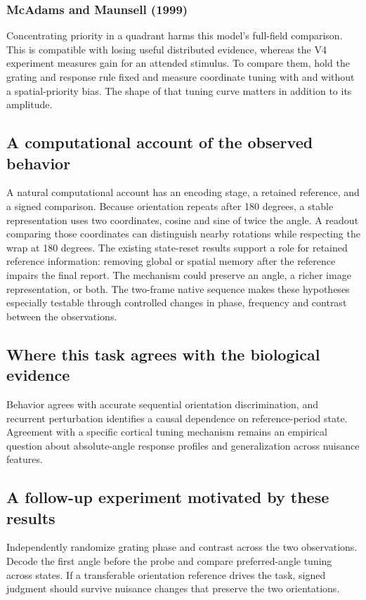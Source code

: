 \documentclass[11pt]{article}
\begin{document}
\subsubsection{McAdams and Maunsell (1999)}
Concentrating priority in a quadrant harms this model’s full-field comparison. This is compatible with losing useful distributed evidence, whereas the V4 experiment measures gain for an attended stimulus. To compare them, hold the grating and response rule fixed and measure coordinate tuning with and without a spatial-priority bias. The shape of that tuning curve matters in addition to its amplitude. \cite{bio_mcadams}

\subsection{A computational account of the observed behavior}
A natural computational account has an encoding stage, a retained reference, and a signed comparison. Because orientation repeats after 180 degrees, a stable representation uses two coordinates, cosine and sine of twice the angle. A readout comparing those coordinates can distinguish nearby rotations while respecting the wrap at 180 degrees. The existing state-reset results support a role for retained reference information: removing global or spatial memory after the reference impairs the final report. The mechanism could preserve an angle, a richer image representation, or both. The two-frame native sequence makes these hypotheses especially testable through controlled changes in phase, frequency and contrast between the observations.

\subsection{Where this task agrees with the biological evidence}
Behavior agrees with accurate sequential orientation discrimination, and recurrent perturbation identifies a causal dependence on reference-period state. Agreement with a specific cortical tuning mechanism remains an empirical question about absolute-angle response profiles and generalization across nuisance features.

\subsection{A follow-up experiment motivated by these results}
Independently randomize grating phase and contrast across the two observations. Decode the first angle before the probe and compare preferred-angle tuning across states. If a transferable orientation reference drives the task, signed judgment should survive nuisance changes that preserve the two orientations.
\end{document}
